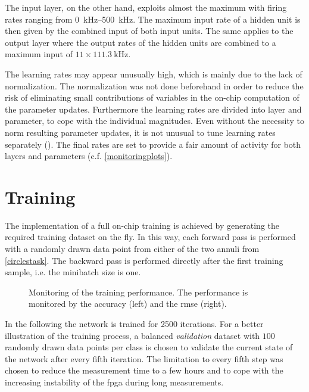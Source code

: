 The input layer, on the other hand, exploits almost the maximum with firing rates ranging from \SIrange{0}{500}{\kilo \Hz}. The maximum input rate of a hidden unit is then given by the combined input of both input units. The same applies to the output layer where the output rates of the hidden units are combined to a maximum input of $11 \times \SI{111.3}{\kilo \Hz}$.

The learning rates may appear unusually high, which is mainly due to the lack of normalization. The normalization was not done beforehand in order to reduce the risk of eliminating small contributions of variables in the on-chip computation of the parameter updates. Furthermore the learning rates are divided into layer and parameter, to cope with the individual magnitudes. Even without the necessity to norm resulting parameter updates, it is not unusual to tune learning rates separately (\citealp{Goodfellow-et-al-2016}). The final rates are set to provide a fair amount of activity for both layers and parameters (c.f. \cref{monitoringplots}).

\section{Training}
The implementation of a full on-chip training is achieved by generating the required training dataset on the fly. In this way, each forward pass is performed with a randomly drawn data point from either of the two annuli from \cref{circlestask}. The backward pass is performed directly after the first training sample, i.e. the minibatch size is one.

\begin{figure}
	\begin{center}
		
	\end{center}
	\caption[Monitoring of the training performance.]{Monitoring of the training performance. The performance is monitored by the accuracy (left) and the \acrfull{rmse} (right).}
	\label{circles_acc}
\end{figure}

In the following the network is trained for 2500 iterations. For a better illustration of the training process, a balanced \emph{validation} dataset with $100$ randomly drawn data points per class is chosen to validate the current state of the network after every fifth iteration. The limitation to every fifth step was chosen to reduce the measurement time to a few hours and to cope with the increasing instability of the \gls{fpga} during long measurements.

